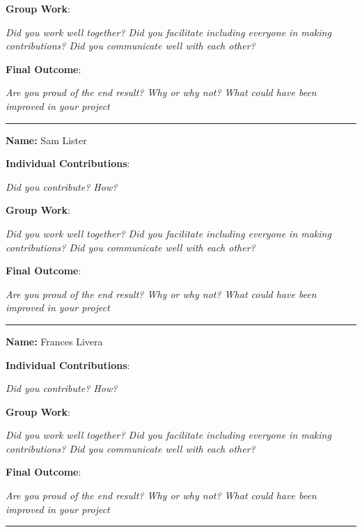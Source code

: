 \documentclass[report.tex]{subfiles}
\begin{document}
\noindent \textbf{Group Work}:

\noindent \emph{Did you work well together? Did you facilitate including everyone in making contributions? Did you communicate well with each other?} \newline

\noindent \textbf{Final Outcome}:

\noindent \emph{Are you proud of the end result? Why or why not? What could have been improved in your project} \newline

\noindent\rule{17cm}{0.4pt}

\noindent \textbf{Name:} Sam Lister \newline

\noindent \textbf{Individual Contributions}:

\noindent \emph{Did you contribute? How?} \newline

\noindent \textbf{Group Work}:

\noindent \emph{Did you work well together? Did you facilitate including everyone in making contributions? Did you communicate well with each other?} \newline

\noindent \textbf{Final Outcome}:

\noindent \emph{Are you proud of the end result? Why or why not? What could have been improved in your project} \newline

\noindent\rule{17cm}{0.4pt}

\noindent \textbf{Name:} Frances Livera \newline

\noindent \textbf{Individual Contributions}:

\noindent \emph{Did you contribute? How?} \newline

\noindent \textbf{Group Work}:

\noindent \emph{Did you work well together? Did you facilitate including everyone in making contributions? Did you communicate well with each other?} \newline

\noindent \textbf{Final Outcome}:

\noindent \emph{Are you proud of the end result? Why or why not? What could have been improved in your project} \newline

\noindent\rule{17cm}{0.4pt}
\end{document}
